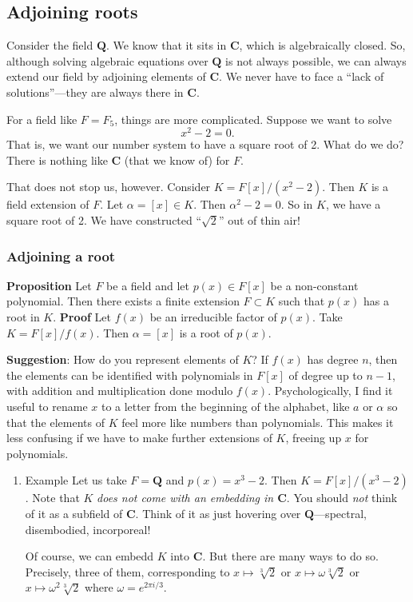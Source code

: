 \documentclass[11pt]{article}
\begin{document}
\subsection{Adjoining roots}
\label{sec:org20ff3a0}
Consider the field \(\mathbf{Q}\).
We know that it sits in \(\mathbf{C}\), which is algebraically closed.
So, although solving algebraic equations over \(\mathbf{Q}\) is not always possible, we can always extend our field by adjoining elements of \(\mathbf{C}\).
We never have to face a ``lack of solutions''---they are always there in \(\mathbf{C}\).

For a field like \(F = F_{5}\), things are more complicated.
Suppose we want to solve
\[ x^{2} - 2 = 0.\]
That is, we want our number system to have a square root of 2.
What do we do?
There is nothing like \(\mathbf{C}\) (that we know of) for \(F\).

That does not stop us, however.
Consider \(K = F[x]/(x^2-2)\).
Then \(K\) is a field extension of \(F\).
Let \(\alpha = [x] \in K\).
Then \(\alpha^2 - 2 = 0.\)
So in \(K\), we have a square root of 2.
We have constructed ``\(\sqrt{2}\)'' out of thin air!
\subsubsection{Adjoining a root}
\label{sec:org0191ad9}
\textbf{\textbf{Proposition}}  Let \(F\) be a field and let \(p(x) \in F[x]\) be a non-constant polynomial.
Then there exists a finite extension \(F \subset K\) such that \(p(x)\) has a root in \(K\).
\textbf{\textbf{Proof}} Let \(f(x)\) be an irreducible factor of \(p(x)\).
Take \(K = F[x]/f(x)\).
Then \(\alpha = [x]\) is a root of \(p(x)\).

\textbf{\textbf{Suggestion}}: How do you represent elements of \(K\)?
If \(f(x)\) has degree \(n\), then the elements can be identified with polynomials in \(F[x]\) of degree up to \(n-1\), with addition and multiplication done modulo \(f(x)\).
Psychologically, I find it useful to rename \(x\) to a letter from the beginning of the alphabet, like \(a\) or \(\alpha\) so that the elements of \(K\) feel more like numbers than polynomials.
This makes it less confusing if we have to make further extensions of \(K\), freeing up \(x\) for polynomials.
\begin{enumerate}
\item Example
\label{sec:org4067b28}
Let us take \(F = \mathbf{Q}\) and \(p(x) = x^3-2\).
Then \(K = F[x]/(x^3-2)\).
Note that \(K\) \emph{does not come with an embedding in \(\mathbf{C}\)}.
You should \emph{not} think of it as a subfield of \(\mathbf{C}\).
Think of it as just hovering over \(\mathbf{Q}\)---spectral, disembodied, incorporeal!

Of course, we can embedd \(K\) into \(\mathbf{C}\).
But there are many ways to do so.
Precisely, three of them, corresponding to \(x \mapsto \sqrt[3]{2}\) or \(x \mapsto \omega\sqrt[3]{2}\) or \(x \mapsto \omega^{2}\sqrt[3]{2}\) where \(\omega = e^{2\pi i/3}\).
\end{enumerate}
\end{document}
